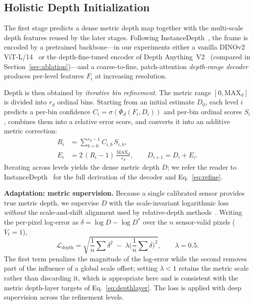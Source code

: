 \documentclass[sigconf, review=true]{acmart}
\begin{document}
\subsection{Holistic Depth Initialization}
\label{ssec:phase1}
The first stage predicts a dense metric depth map together with the multi-scale
depth features reused by the later stages. Following
InstanceDepth~\cite{liang2025instancedepth}, the frame is encoded by a
pretrained backbone---in our experiments either a vanilla DINOv2
ViT-L/14~\cite{oquab2024dinov2} or the depth-fine-tuned encoder of Depth
Anything~V2~\cite{yang2024depthanythingv2} (compared in
Section~\ref{sec:ablation})---and a coarse-to-fine, patch-attention
\emph{depth-range decoder} produces per-level features $F_i$ at increasing
resolution.

Depth is then obtained by \emph{iterative bin refinement}. The metric range
$[0,\mathrm{MAX}_d]$ is divided into $r_d$ ordinal bins. Starting from an initial
estimate $D_0$, each level $i$ predicts a per-bin confidence
$C_i=\sigma(\Phi_d(F_i,D_i))$ and per-bin ordinal scores $S_i$, combines them
into a relative error score, and converts it into an additive metric
correction:
\begin{align}
\label{eq:refine}
R_i &= \sum_{b=0}^{r_d-1} C_{i,b}\,S_{i,b}, \\
E_i &= 2\,(R_i-1)\,\frac{\mathrm{MAX}_d}{r_d}, \qquad D_{i+1}=D_i+E_i .
\end{align}
Iterating across levels yields the dense metric depth $D$; we refer the reader
to InstanceDepth~\cite{liang2025instancedepth} for the full derivation of the
decoder and Eq.~\eqref{eq:refine}.

\smallskip\noindent\textbf{Adaptation: metric supervision.}
Because a single calibrated sensor provides true metric depth, we supervise $D$
with the scale-invariant logarithmic loss~\cite{eigen2014silog} \emph{without}
the scale-and-shift alignment used by relative-depth
methods~\cite{ranftl2022midas,yang2024depthanythingv2}. Writing the per-pixel
log-error as $\delta=\log D-\log D^{*}$ over the $n$ sensor-valid pixels
($V_t=1$),
\begin{equation}
\label{eq:silog}
\mathcal{L}_{\mathrm{depth}} =
\sqrt{\frac{1}{n}\sum \delta^2 \;-\; \lambda\Big(\frac{1}{n}\sum \delta\Big)^2},
\qquad \lambda=0.5 .
\end{equation}
The first term penalizes the magnitude of the log-error while the second removes
part of the influence of a global scale offset; setting $\lambda<1$ retains the
metric scale rather than discarding it, which is appropriate here and is
consistent with the metric depth-layer targets of Eq.~\eqref{eq:depthlayer}. The
loss is applied with deep supervision across the refinement levels.
\end{document}
